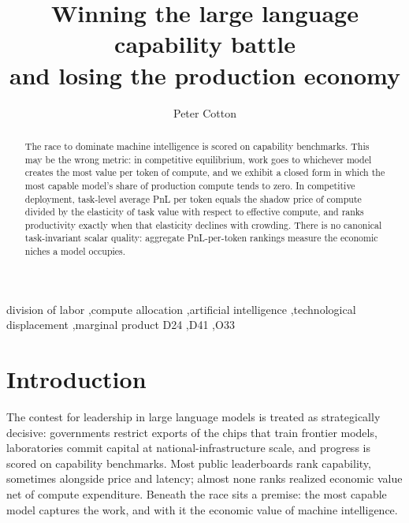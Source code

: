 \documentclass[preprint,11pt,authoryear]{elsarticle}
\begin{document}
\begin{frontmatter}

\title{Winning the large language capability battle\\ and losing the production economy}

\author{Peter Cotton}
\address{Global Strategic Minerals Corporation}

\begin{abstract}
The race to dominate machine intelligence is scored on capability benchmarks. This may be the wrong metric: in competitive equilibrium, work goes to whichever model creates the most value per token of compute, and we exhibit a closed form in which the most capable model's share of production compute tends to zero. In competitive deployment, task-level average PnL per token equals the shadow price of compute divided by the elasticity of task value with respect to effective compute, and ranks productivity exactly when that elasticity declines with crowding. There is no canonical task-invariant scalar quality: aggregate PnL-per-token rankings measure the economic niches a model occupies.
\end{abstract}

\begin{keyword}
division of labor \sep compute allocation \sep artificial intelligence \sep technological displacement \sep marginal product
\JEL D24 \sep D41 \sep O33
\end{keyword}

\end{frontmatter}

\section{Introduction}

The contest for leadership in large language models is treated as strategically decisive: governments restrict exports of the chips that train frontier models, laboratories commit capital at national-infrastructure scale, and progress is scored on capability benchmarks. Most public leaderboards rank capability, sometimes alongside price and latency; almost none ranks realized economic value net of compute expenditure. Beneath the race sits a premise: the most capable model captures the work, and with it the economic value of machine intelligence.
\end{document}
